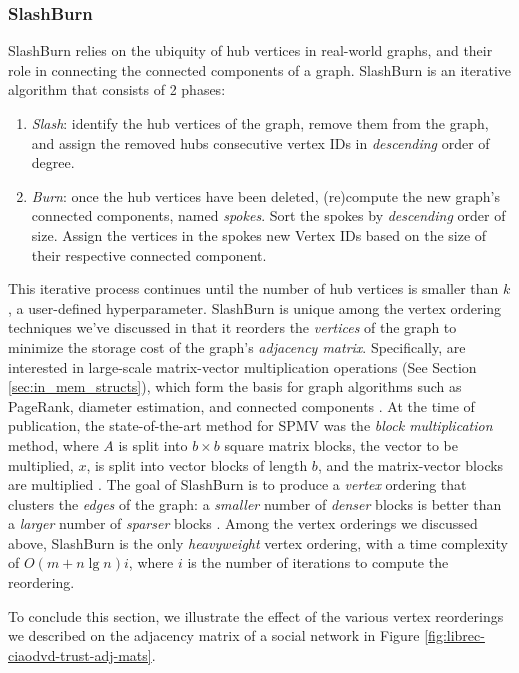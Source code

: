 \subsubsection{SlashBurn}
SlashBurn relies on the ubiquity of hub vertices in real-world graphs, and their role in connecting the connected components of a graph. SlashBurn is an iterative algorithm that consists of 2 phases: 
\begin{enumerate}
    \item \textit{Slash}: identify the hub vertices of the graph, remove them from the graph, and assign the removed hubs consecutive vertex IDs in \textit{descending} order of degree. 
    \item \textit{Burn}: once the hub vertices have been deleted, (re)compute the new graph's connected components, named \textit{spokes}. 
    Sort the spokes by \textit{descending} order of size. Assign the vertices in the spokes new Vertex IDs based on the size of their respective connected component.
\end{enumerate}
This iterative process continues until the number of hub vertices is smaller than $k$, a user-defined hyperparameter.  
SlashBurn is unique among the vertex ordering techniques we've discussed in that it reorders the \textit{vertices} of the graph to minimize the storage cost of the graph's \textit{adjacency matrix}. Specifically, \citet{slashburn} are interested in large-scale matrix-vector multiplication operations (See Section \ref{sec:in_mem_structs}), which form the basis for graph algorithms such as PageRank, diameter estimation, and connected components \cite{pegasus}. At the time of publication, the state-of-the-art method for \ac{SPMV} was the \textit{block multiplication} method, where $A$ is split into $b\times b$
square matrix blocks, the vector to be multiplied, $x$, is split into vector blocks of length $b$, and the matrix-vector blocks are multiplied \cite{pegasus}. The goal of SlashBurn is to produce a \textit{vertex} ordering that clusters the \textit{edges} of the graph: a \textit{smaller} number of \textit{denser} blocks is better than a \textit{larger} number of \textit{sparser} blocks \cite{slashburn}.
Among the vertex orderings we discussed above, SlashBurn is the only \textit{heavyweight} vertex ordering, with a time complexity of $O(m + n\lg n)i$, where $i$ is the number of iterations to compute the reordering. 

To conclude this section, we illustrate the effect of the various vertex reorderings we described on the adjacency matrix of a social network in Figure \ref{fig:librec-ciaodvd-trust-adj-mats}.




